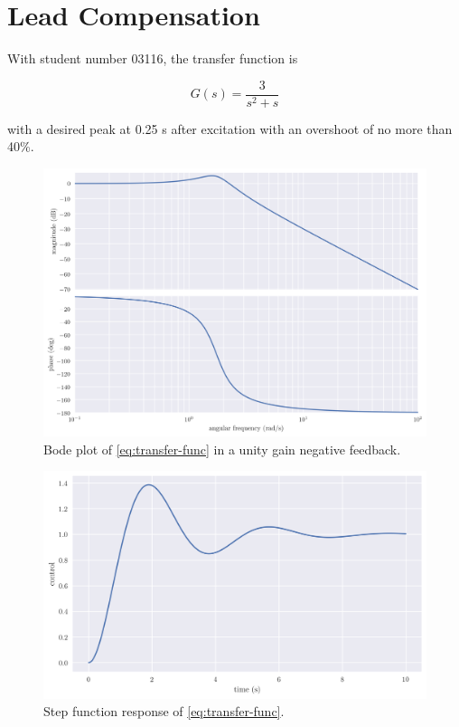 \documentclass[12pt,a4paper]{article}
\begin{document}
\setcounter{page}{1}

\section*{Lead Compensation}
\bigskip

With student number 03116, the transfer function is

\begin{equation}
	G(s) = \frac{3}{s^2 + s} \label{eq:transfer-func}
\end{equation}

\noindent
with a desired peak at 0.25 s after excitation with an overshoot of no more than 40\%.

\begin{figure}[h!]
	\centering
	\includegraphics[width=0.75\linewidth]{sys_bode.png}
	\caption{Bode plot of \eqref{eq:transfer-func} in a unity gain negative feedback.}
	\label{fig:bode}
\end{figure}

\begin{figure}[h!]
	\centering
	\includegraphics[width=0.75\linewidth]{sys-response.png}
	\caption{Step function response of \eqref{eq:transfer-func}.}
	\label{fig:sys-response}
\end{figure}
\end{document}
